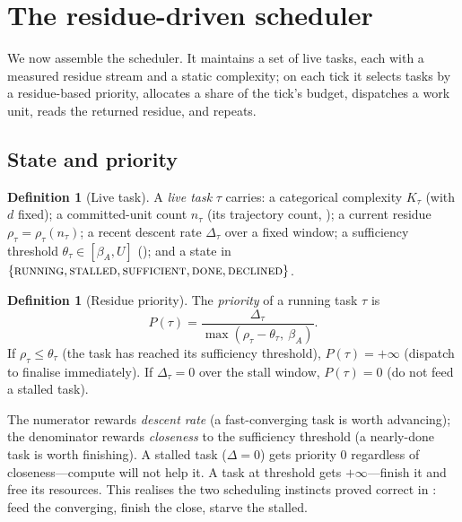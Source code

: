 \documentclass[twocolumn,10pt,a4paper]{article}
\theoremstyle{thmstyle}
\theoremstyle{definition}
\newtheorem{definition}[theorem]{Definition}
\theoremstyle{remark}
\newcommand{\floor}{\beta}
\newcommand{\res}{\rho}
\newcommand{\task}{\tau}
\begin{document}
\section{The residue-driven scheduler}
\label{sec:scheduler}

We now assemble the scheduler. It maintains a set of live tasks, each
with a measured residue stream and a static complexity; on each tick it
selects tasks by a residue-based priority, allocates a share of the
tick's budget, dispatches a work unit, reads the returned residue, and
repeats.

\subsection{State and priority}

\begin{definition}[Live task]
\label{def:livetask}
A \emph{live task} $\task$ carries: a categorical complexity $K_\task$
(with $d$ fixed); a committed-unit count $n_\task$ (its trajectory count,
); a current residue $\res_\task=\res_\task(n_\task)$; a
recent descent rate $\Delta_\task$ over a fixed window; a sufficiency
threshold $\theta_\task\in[\floor_A,U]$ (); and a
state in $\{\textsc{running},\textsc{stalled},\textsc{sufficient},
\textsc{done},\textsc{declined}\}$.
\end{definition}

\begin{definition}[Residue priority]
\label{def:priority}
The \emph{priority} of a running task $\task$ is
\[
P(\task)=
\frac{\Delta_\task}{\max(\res_\task-\theta_\task,\ \floor_A)} .
\]
If $\res_\task\le\theta_\task$ (the task has reached its sufficiency
threshold), $P(\task)=+\infty$ (dispatch to finalise immediately). If
$\Delta_\task=0$ over the stall window, $P(\task)=0$ (do not feed a
stalled task).
\end{definition}

The numerator rewards \emph{descent rate} (a fast-converging task is
worth advancing); the denominator rewards \emph{closeness} to the
sufficiency threshold (a nearly-done task is worth finishing). A stalled
task ($\Delta=0$) gets priority $0$ regardless of closeness---compute
will not help it. A task at threshold gets $+\infty$---finish it and free
its resources. This realises the two scheduling instincts proved correct
in : feed the converging, finish the close, starve the
stalled.
\end{document}
